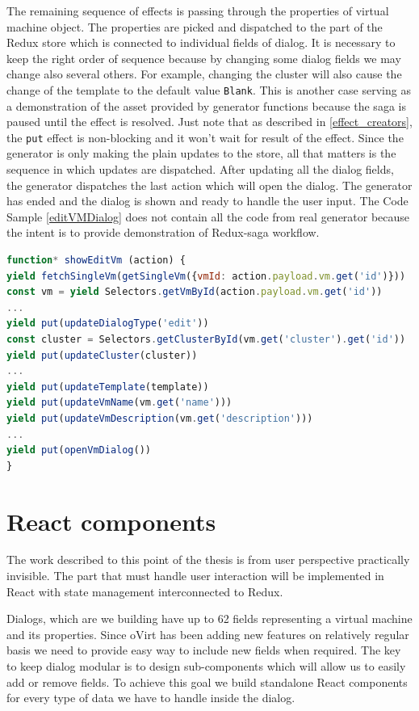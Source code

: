 The remaining sequence of effects is passing through the properties of virtual machine object. The properties are picked and dispatched to the part of the Redux store which is connected to individual fields of dialog. It is necessary to keep the right order of sequence because by changing some dialog fields we may change also several others. For example, changing the cluster will also cause the change of the template to the default value \texttt{Blank}. This is another case serving as a demonstration of the asset provided by generator functions because the saga is paused until the effect is resolved. Just note that as described in \ref{effect_creators}, the \texttt{put} effect is non-blocking and it won't wait for result of the effect. Since the generator is only making the plain updates to the store, all that matters is the sequence in which updates are dispatched. After updating all the dialog fields, the generator dispatches the last action which will open the dialog. The generator has ended and the dialog is shown and ready to handle the user input. The Code Sample \ref{editVMDialog} does not contain all the code from real generator because the intent is to provide demonstration of Redux-saga workflow.

\bigskip
\begin{lstlisting}[language=javascript,xleftmargin=3.5ex,caption={Saga responsible for initiating and showing the Edit VM dialog }]
function* showEditVm (action) {
yield fetchSingleVm(getSingleVm({vmId: action.payload.vm.get('id')}))
const vm = yield Selectors.getVmById(action.payload.vm.get('id'))
...
yield put(updateDialogType('edit'))
const cluster = Selectors.getClusterById(vm.get('cluster').get('id'))
yield put(updateCluster(cluster))
...
yield put(updateTemplate(template))
yield put(updateVmName(vm.get('name')))
yield put(updateVmDescription(vm.get('description')))
...
yield put(openVmDialog())
}
\end{lstlisting}\label{editVmSaga}
\bigskip

\section{React components}
The work described to this point of the thesis is from user perspective practically invisible. The part that must handle user interaction will be implemented in React with state management interconnected to Redux. 

Dialogs, which are we building have up to 62 fields representing a virtual machine and its properties. Since oVirt has been adding new features on relatively regular basis we need to provide easy way to include new fields when required. The key to keep dialog modular is to design sub-components which will allow us to easily add or remove fields. To achieve this goal we build standalone React components for every type of data we have to handle inside the dialog.

